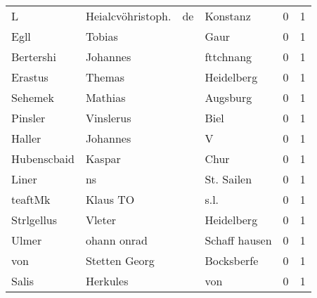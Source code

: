 \documentclass[10pt,a4paper,landscape]{article}
\begin{document}
\begin{longtable}{llllrr}
                        L &                  Heialcvöhristoph. &          de &                                    Konstanz &          0 &         1 \\
                     Egll &                             Tobias &             &                                        Gaur &          0 &         1 \\
                Bertershi &                           Johannes &             &                                   fttchnang &          0 &         1 \\
                  Erastus &                             Themas &             &                                  Heidelberg &          0 &         1 \\
                  Sehemek &                            Mathias &             &                                    Augsburg &          0 &         1 \\
                  Pinsler &                          Vinslerus &             &                                        Biel &          0 &         1 \\
                   Haller &                           Johannes &             &                                           V &          0 &         1 \\
              Hubenscbaid &                             Kaspar &             &                                        Chur &          0 &         1 \\
                    Liner &                                 ns &             &                                  St. Sailen &          0 &         1 \\
                  teaftMk &                           Klaus TO &             &                                        s.l. &          0 &         1 \\
               Strlgellus &                             Vleter &             &                                  Heidelberg &          0 &         1 \\
                    Ulmer &                        ohann onrad &             &                               Schaff hausen &          0 &         1 \\
                      von &                      Stetten Georg &             &                                  Bocksberfe &          0 &         1 \\
                    Salis &                           Herkules &             &                                         von &          0 &         1 \\

\end{longtable}
\end{document}
